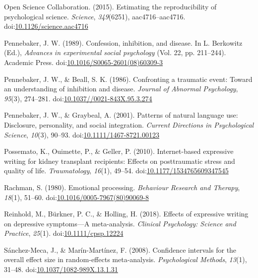 \documentclass[man, mask]{apa6}
\theoremstyle{definition}
\theoremstyle{definition}
\theoremstyle{definition}
\theoremstyle{remark}
\begin{document}
\hypertarget{ref-OpenScienceCollaboration2015}{}
Open Science Collaboration. (2015). Estimating the reproducibility of
psychological science. \emph{Science}, \emph{349}(6251),
aac4716--aac4716.
doi:\href{https://doi.org/10.1126/science.aac4716}{10.1126/science.aac4716}

\hypertarget{ref-Pennebaker1989}{}
Pennebaker, J. W. (1989). Confession, inhibition, and disease. In L.
Berkowitz (Ed.), \emph{Advances in experimental social psychology} (Vol.
22, pp. 211--244). Academic Press.
doi:\href{https://doi.org/10.1016/S0065-2601(08)60309-3}{10.1016/S0065-2601(08)60309-3}

\hypertarget{ref-Pennebaker1986}{}
Pennebaker, J. W., \& Beall, S. K. (1986). Confronting a traumatic
event: Toward an understanding of inhibition and disease. \emph{Journal
of Abnormal Psychology}, \emph{95}(3), 274--281.
doi:\href{https://doi.org/10.1037//0021-843X.95.3.274}{10.1037//0021-843X.95.3.274}

\hypertarget{ref-Pennebaker2001}{}
Pennebaker, J. W., \& Graybeal, A. (2001). Patterns of natural language
use: Disclosure, personality, and social integration. \emph{Current
Directions in Psychological Science}, \emph{10}(3), 90--93.
doi:\href{https://doi.org/10.1111/1467-8721.00123}{10.1111/1467-8721.00123}

\hypertarget{ref-Possemato2010}{}
Possemato, K., Ouimette, P., \& Geller, P. (2010). Internet-based
expressive writing for kidney transplant recipients: Effects on
posttraumatic stress and quality of life. \emph{Traumatology},
\emph{16}(1), 49--54.
doi:\href{https://doi.org/10.1177/1534765609347545}{10.1177/1534765609347545}

\hypertarget{ref-Rachman1980}{}
Rachman, S. (1980). Emotional processing. \emph{Behaviour Research and
Therapy}, \emph{18}(1), 51--60.
doi:\href{https://doi.org/10.1016/0005-7967(80)90069-8}{10.1016/0005-7967(80)90069-8}

\hypertarget{ref-Reinhold2018}{}
Reinhold, M., Bürkner, P. C., \& Holling, H. (2018). Effects of
expressive writing on depressive symptoms---A meta-analysis.
\emph{Clinical Psychology: Science and Practice}, \emph{25}(1).
doi:\href{https://doi.org/10.1111/cpsp.12224}{10.1111/cpsp.12224}

\hypertarget{ref-Sanchez-Meca2008a}{}
Sánchez-Meca, J., \& Marín-Martínez, F. (2008). Confidence intervals for
the overall effect size in random-effects meta-analysis.
\emph{Psychological Methods}, \emph{13}(1), 31--48.
doi:\href{https://doi.org/10.1037/1082-989X.13.1.31}{10.1037/1082-989X.13.1.31}
\end{document}
